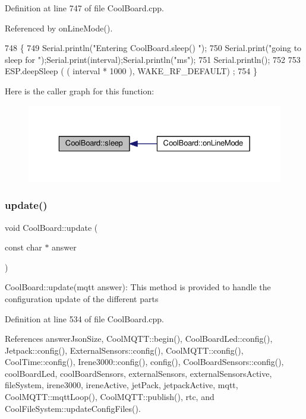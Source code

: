 Definition at line 747 of file Cool\+Board.\+cpp.



Referenced by on\+Line\+Mode().


\begin{DoxyCode}
748 \{
749     Serial.println(\textcolor{stringliteral}{"Entering CoolBoard.sleep() "});
750     Serial.print(\textcolor{stringliteral}{"going to sleep for "});Serial.print(interval);Serial.println(\textcolor{stringliteral}{"ms"});
751     Serial.println();
752 
753     ESP.deepSleep ( ( interval * 1000 ), WAKE\_RF\_DEFAULT) ;
754 \}
\end{DoxyCode}
Here is the caller graph for this function\+:
\nopagebreak
\begin{figure}[H]
\begin{center}
\leavevmode
\includegraphics[width=329pt]{classCoolBoard_a5d0c8ff93b615efd676be432de9f164a_icgraph}
\end{center}
\end{figure}
\mbox{\label{classCoolBoard_a8612756d3f73198cdde857a66f0fe690}} 
\subsubsection{\texorpdfstring{update()}{update()}}
{\footnotesize\ttfamily void Cool\+Board\+::update (\begin{DoxyParamCaption}\item[{const char $\ast$}]{answer }\end{DoxyParamCaption})}

Cool\+Board\+::update(mqtt answer)\+: This method is provided to handle the configuration update of the different parts 

Definition at line 534 of file Cool\+Board.\+cpp.



References answer\+Json\+Size, Cool\+M\+Q\+T\+T\+::begin(), Cool\+Board\+Led\+::config(), Jetpack\+::config(), External\+Sensors\+::config(), Cool\+M\+Q\+T\+T\+::config(), Cool\+Time\+::config(), Irene3000\+::config(), config(), Cool\+Board\+Sensors\+::config(), cool\+Board\+Led, cool\+Board\+Sensors, external\+Sensors, external\+Sensors\+Active, file\+System, irene3000, irene\+Active, jet\+Pack, jetpack\+Active, mqtt, Cool\+M\+Q\+T\+T\+::mqtt\+Loop(), Cool\+M\+Q\+T\+T\+::publish(), rtc, and Cool\+File\+System\+::update\+Config\+Files().




